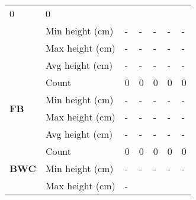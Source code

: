 \begin{longtable}{|p{2cm}|p{2cm}|p{1.5cm}|p{1.5cm}|p{1.5cm}|p{1.5cm}|p{1.5cm}|}
						\multicolumn{1}{l|}{0} &
						\multicolumn{1}{l|}{0} \\\cline{2-7} &
						\multicolumn{1}{l|}{Min height (cm)} & 
						\multicolumn{1}{l|}{-} & 
						\multicolumn{1}{l|}{-} &
						\multicolumn{1}{l|}{-} & 
						\multicolumn{1}{l|}{-} &
						\multicolumn{1}{l|}{-} \\\cline{2-7} &
						\multicolumn{1}{l|}{Max height (cm)} & 
						\multicolumn{1}{l|}{-} & 
						\multicolumn{1}{l|}{-} &
						\multicolumn{1}{l|}{-} & 
						\multicolumn{1}{l|}{-} &
						\multicolumn{1}{l|}{-} \\\cline{2-7} &
						\multicolumn{1}{l|}{Avg height (cm)} & 
						\multicolumn{1}{l|}{-} & 
						\multicolumn{1}{l|}{-} &
						\multicolumn{1}{l|}{-} & 
						\multicolumn{1}{l|}{-} & 
						\multicolumn{1}{l|}{-} \\\cline{2-7}
		\hline    
		\multirow{4}{*}{\textbf{FB}} & 
						\multicolumn{1}{l|}{Count} & 
						\multicolumn{1}{l|}{0} & 
						\multicolumn{1}{l|}{0} &
						\multicolumn{1}{l|}{0} & 
						\multicolumn{1}{l|}{0} &
						\multicolumn{1}{l|}{0} \\\cline{2-7} &
						\multicolumn{1}{l|}{Min height (cm)} & 
						\multicolumn{1}{l|}{-} & 
						\multicolumn{1}{l|}{-} &
						\multicolumn{1}{l|}{-} & 
						\multicolumn{1}{l|}{-} &
						\multicolumn{1}{l|}{-} \\\cline{2-7} &
						\multicolumn{1}{l|}{Max height (cm)} & 
						\multicolumn{1}{l|}{-} & 
						\multicolumn{1}{l|}{-} &
						\multicolumn{1}{l|}{-} & 
						\multicolumn{1}{l|}{-} &
						\multicolumn{1}{l|}{-} \\\cline{2-7} &
						\multicolumn{1}{l|}{Avg height (cm)} & 
						\multicolumn{1}{l|}{-} & 
						\multicolumn{1}{l|}{-} &
						\multicolumn{1}{l|}{-} & 
						\multicolumn{1}{l|}{-} & 
						\multicolumn{1}{l|}{-} \\\cline{2-7}
		\hline    
		\multirow{4}{*}{\textbf{BWC}} & 
						\multicolumn{1}{l|}{Count} & 
						\multicolumn{1}{l|}{0} & 
						\multicolumn{1}{l|}{0} &
						\multicolumn{1}{l|}{0} & 
						\multicolumn{1}{l|}{0} &
						\multicolumn{1}{l|}{0} \\\cline{2-7} &
						\multicolumn{1}{l|}{Min height (cm)} & 
						\multicolumn{1}{l|}{-} & 
						\multicolumn{1}{l|}{-} &
						\multicolumn{1}{l|}{-} & 
						\multicolumn{1}{l|}{-} &
						\multicolumn{1}{l|}{-} \\\cline{2-7} &
						\multicolumn{1}{l|}{Max height (cm)} & 
						\multicolumn{1}{l|}{-} & 

\end{longtable}
